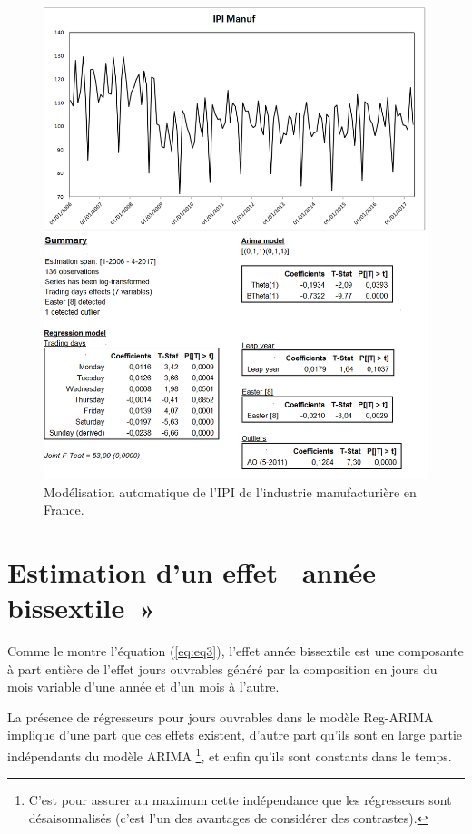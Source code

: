 \documentclass[12pt, a4paper, french]{article}
\begin{document}
\begin{figure}[!ht]
\begin{center}
 \includegraphics[scale=0.7]{img/IPImanuf.png}
 \caption{Modélisation automatique de l'IPI de l'industrie manufacturière en France.}
 \label{fig:IPI}
\end{center}
\end{figure}

\clearpage

\section{Estimation d'un effet \og~année bissextile~»}
\label{sec:LY}

Comme le montre l'équation (\ref{eq:eq3}), l'effet année bissextile est une composante à part entière de l'effet jours ouvrables généré par la composition en jours du mois variable d'une année et d'un mois à l'autre.

La présence de régresseurs pour jours ouvrables dans le modèle Reg-ARIMA implique d'une part que ces effets existent, d'autre part qu'ils sont en large partie indépendants du modèle ARIMA \footnote{C'est pour assurer au maximum cette indépendance que les régresseurs sont désaisonnalisés (c'est l'un des avantages de considérer des contrastes).}, et enfin qu'ils sont constants dans le temps.
\end{document}
